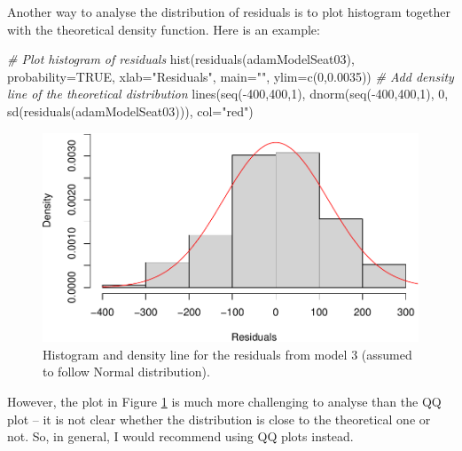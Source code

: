 \documentclass[
]{book}
\newenvironment{Shaded}{\begin{snugshade}}{\end{snugshade}}
\newcommand{\AttributeTok}[1]{\textcolor[rgb]{0.77,0.63,0.00}{#1}}
\newcommand{\CommentTok}[1]{\textcolor[rgb]{0.56,0.35,0.01}{\textit{#1}}}
\newcommand{\ConstantTok}[1]{\textcolor[rgb]{0.00,0.00,0.00}{#1}}
\newcommand{\DecValTok}[1]{\textcolor[rgb]{0.00,0.00,0.81}{#1}}
\newcommand{\FloatTok}[1]{\textcolor[rgb]{0.00,0.00,0.81}{#1}}
\newcommand{\FunctionTok}[1]{\textcolor[rgb]{0.00,0.00,0.00}{#1}}
\newcommand{\NormalTok}[1]{#1}
\newcommand{\SpecialCharTok}[1]{\textcolor[rgb]{0.00,0.00,0.00}{#1}}
\newcommand{\StringTok}[1]{\textcolor[rgb]{0.31,0.60,0.02}{#1}}
\theoremstyle{definition}
\theoremstyle{definition}
\theoremstyle{definition}
\theoremstyle{definition}
\theoremstyle{remark}
\begin{document}
Another way to analyse the distribution of residuals is to plot histogram together with the theoretical density function. Here is an example:

\begin{Shaded}
\begin{Highlighting}[]
\CommentTok{\# Plot histogram of residuals}
\FunctionTok{hist}\NormalTok{(}\FunctionTok{residuals}\NormalTok{(adamModelSeat03), }\AttributeTok{probability=}\ConstantTok{TRUE}\NormalTok{,}
     \AttributeTok{xlab=}\StringTok{"Residuals"}\NormalTok{, }\AttributeTok{main=}\StringTok{""}\NormalTok{, }\AttributeTok{ylim=}\FunctionTok{c}\NormalTok{(}\DecValTok{0}\NormalTok{,}\FloatTok{0.0035}\NormalTok{))}
\CommentTok{\# Add density line of the theoretical distribution}
\FunctionTok{lines}\NormalTok{(}\FunctionTok{seq}\NormalTok{(}\SpecialCharTok{{-}}\DecValTok{400}\NormalTok{,}\DecValTok{400}\NormalTok{,}\DecValTok{1}\NormalTok{),}
      \FunctionTok{dnorm}\NormalTok{(}\FunctionTok{seq}\NormalTok{(}\SpecialCharTok{{-}}\DecValTok{400}\NormalTok{,}\DecValTok{400}\NormalTok{,}\DecValTok{1}\NormalTok{), }\DecValTok{0}\NormalTok{, }\FunctionTok{sd}\NormalTok{(}\FunctionTok{residuals}\NormalTok{(adamModelSeat03))),}
      \AttributeTok{col=}\StringTok{"red"}\NormalTok{)}
\end{Highlighting}
\end{Shaded}

\begin{figure}
\centering
\includegraphics{Svetunkov--2022----ADAM_files/figure-latex/adamModelSeat3Density-1.pdf}
\caption{\label{fig:adamModelSeat3Density}Histogram and density line for the residuals from model 3 (assumed to follow Normal distribution).}
\end{figure}

However, the plot in Figure \ref{fig:adamModelSeat3Density} is much more challenging to analyse than the QQ plot -- it is not clear whether the distribution is close to the theoretical one or not. So, in general, I would recommend using QQ plots instead.
\end{document}
